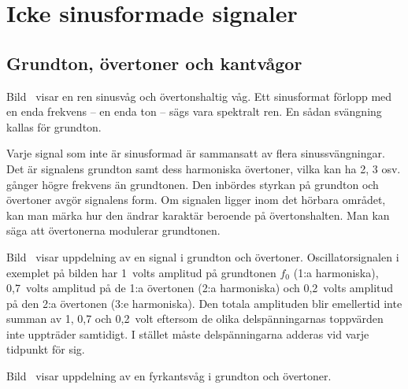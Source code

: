 \newpage
\section{Icke sinusformade signaler}

\subsection{Grundton, övertoner och kantvågor}
\label{övertoner}


Bild~ visar en ren sinusvåg och övertonshaltig våg.
Ett sinusformat förlopp med en enda frekvens -- en enda ton -- sägs vara
spektralt ren.
En sådan svängning kallas för grundton.

Varje signal som inte är sinusformad är sammansatt av flera sinussvängningar.
Det är signalens grundton samt dess harmoniska övertoner, vilka kan ha 2, 3
osv. gånger högre frekvens än grundtonen.
Den inbördes styrkan på grundton och övertoner avgör signalens form.
Om signalen ligger inom det hörbara området, kan man märka hur den ändrar
karaktär beroende på övertonshalten.
Man kan säga att övertonerna modulerar grundtonen.


Bild~ visar uppdelning av en signal i grundton och
övertoner.
Oscillatorsignalen i exemplet på bilden har 1~volts amplitud på grundtonen
\(f_0\) (1:a harmoniska), 0,7~volts amplitud på de 1:a övertonen
(2:a harmoniska) och 0,2~volts amplitud på den 2:a övertonen (3:e harmoniska).
Den totala amplituden blir emellertid inte summan av 1, 0,7 och 0,2~volt
eftersom de olika delspänningarnas toppvärden inte uppträder samtidigt.
I stället måste delspänningarna adderas vid varje tidpunkt för sig.


Bild~ visar uppdelning av en fyrkantsvåg i grundton och
övertoner.

